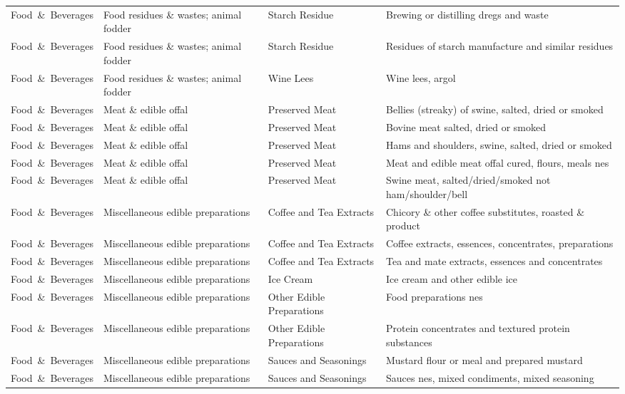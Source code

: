 \begin{appendices}
\begin{xltabular}{\textwidth}{|p{0.10\textwidth}|p{0.30\textwidth}|p{0.20\textwidth}|p{0.30\textwidth}|}
		Food\ \&\ Beverages & Food residues \& wastes; animal fodder & Starch Residue & Brewing or distilling dregs and waste \\
		Food\ \&\ Beverages & Food residues \& wastes; animal fodder & Starch Residue & Residues of starch manufacture and similar residues \\
		Food\ \&\ Beverages & Food residues \& wastes; animal fodder & Wine Lees & Wine lees, argol \\
		Food\ \&\ Beverages & Meat \& edible offal & Preserved Meat & Bellies (streaky) of swine, salted, dried or smoked \\
		Food\ \&\ Beverages & Meat \& edible offal & Preserved Meat & Bovine meat salted, dried or smoked \\
		Food\ \&\ Beverages & Meat \& edible offal & Preserved Meat & Hams and shoulders, swine, salted, dried or smoked \\
		Food\ \&\ Beverages & Meat \& edible offal & Preserved Meat & Meat and edible meat offal cured, flours, meals nes \\
		Food\ \&\ Beverages & Meat \& edible offal & Preserved Meat & Swine meat, salted/dried/smoked not ham/shoulder/bell \\
		Food\ \&\ Beverages & Miscellaneous edible preparations & Coffee and Tea Extracts & Chicory \& other coffee substitutes, roasted \& product \\
		Food\ \&\ Beverages & Miscellaneous edible preparations & Coffee and Tea Extracts & Coffee extracts, essences, concentrates, preparations \\
		Food\ \&\ Beverages & Miscellaneous edible preparations & Coffee and Tea Extracts & Tea and mate extracts, essences and concentrates \\
		Food\ \&\ Beverages & Miscellaneous edible preparations & Ice Cream & Ice cream and other edible ice \\
		Food\ \&\ Beverages & Miscellaneous edible preparations & Other Edible Preparations & Food preparations nes \\
		Food\ \&\ Beverages & Miscellaneous edible preparations & Other Edible Preparations & Protein concentrates and textured protein substances \\
		Food\ \&\ Beverages & Miscellaneous edible preparations & Sauces and Seasonings & Mustard flour or meal and prepared mustard \\
		Food\ \&\ Beverages & Miscellaneous edible preparations & Sauces and Seasonings & Sauces nes, mixed condiments, mixed seasoning \\

\end{xltabular}
\end{appendices}

